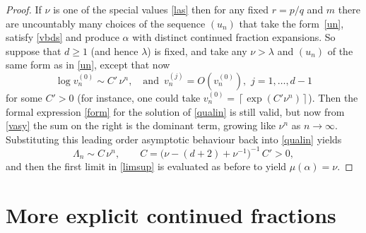 \documentclass[10pt, a4paper]{amsart}
\numberwithin{equation}{section}
\newcommand\la{\lambda}
\newcommand\La{\Lambda}
\newcommand\al{{\alpha}}
\theoremstyle{plain}
\theoremstyle{definition}
\begin{document}
\begin{proof} 
If $\nu$ is one of the special values \eqref{las}  
then for any fixed $r=p/q$ and $m$ there are 
uncountably many choices of the sequence $(u_n)$ that 
take the form~\eqref{un}, satisfy \eqref{vbds} and produce $\al$ with 
distinct continued fraction expansions. So suppose that 
$d\geq 1$ (and hence $\la$) is fixed, and take any $\nu>\la$ and 
$(u_n)$ of the same form as in \eqref{un}, except that now 
\begin{equation}
\label{vasy}
\log v_n^{(0)} \sim C' \, \nu^n,  \quad \text{and} \,\,\, v_n^{(j)}=O( v_n^{(0)}), \,\, j=1,\ldots, d-1
\end{equation}  
for some $C'>0$ (for instance, one could take 
$ v_n^{(0)}=\left \lceil{\exp (C'\nu^n)}\right \rceil$). 
Then the formal expression \eqref{form} for the solution of \eqref{qualin} 
is still valid, but now from \eqref{vasy} 
the sum on the right is the dominant term, growing like 
$\nu^n$ as $n\to\infty$. Substituting this leading order asymptotic behaviour 
back into \eqref{qualin} yields 
\[ 
\La_n\sim C\, \nu^n, \qquad C=\Big(\nu-(d+2)+\nu^{-1}\Big)^{-1}\, C'>0, 
\] 
and then the first limit 
in \eqref{limsup} is evaluated as before to yield $\mu(\al)=\nu$. 
\end{proof}

\section{More explicit continued fractions} 
\end{document}
